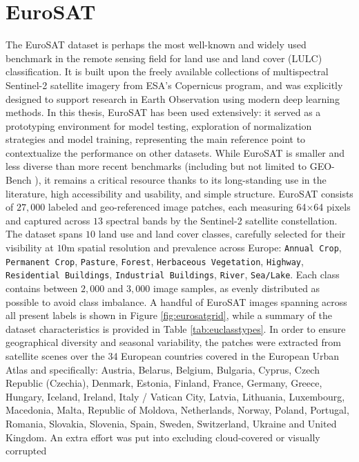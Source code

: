 \documentclass[a4paper, twoside, english]{sapthesis} %
\begin{document}

\section{EuroSAT}\label{EuroSAT}

The EuroSAT dataset \cite{helber2019eurosat} is perhaps the most well-known and widely used benchmark in the remote sensing field for land use and land cover (LULC) classification. It is built upon the freely available collections of multispectral Sentinel-2 satellite imagery from ESA’s Copernicus program, and was explicitly designed to support research in Earth Observation using modern deep learning methods. In this thesis, EuroSAT has been used extensively: it served as a prototyping environment for model testing, exploration of normalization strategies and model training, representing the main reference point to contextualize the performance on other datasets. While EuroSAT is smaller and less diverse than more recent benchmarks (including but not limited to GEO-Bench \cite{lacoste2023geo}), it remains a critical resource thanks to its long-standing use in the literature, high accessibility and usability, and simple structure. EuroSAT consists of $27,000$ labeled and geo-referenced image patches, each measuring 64×64 pixels and captured across $13$ spectral bands by the Sentinel-2 satellite constellation. The dataset spans $10$ land use and land cover classes, carefully selected for their visibility at $10$m spatial resolution and prevalence across Europe: \texttt{Annual Crop}, \texttt{Permanent Crop}, \texttt{Pasture}, \texttt{Forest}, \texttt{Herbaceous Vegetation}, \texttt{Highway}, \texttt{Residential Buildings}, \texttt{Industrial Buildings}, \texttt{River}, \texttt{Sea/Lake}. Each class contains between $2,000$ and $3,000$ image samples, as evenly distributed as possible to avoid class imbalance. A handful of EuroSAT images spanning across all present labels is shown in Figure \ref{fig:eurosatgrid}, while a summary of the dataset characteristics is provided in Table \ref{tab:euclasstypes}. In order to ensure geographical diversity and seasonal variability, the patches were extracted from satellite scenes over the 34 European countries covered in the European Urban Atlas and specifically: Austria, Belarus, Belgium, Bulgaria, Cyprus, Czech Republic (Czechia), Denmark, Estonia, Finland, France, Germany, Greece, Hungary, Iceland, Ireland, Italy / Vatican City, Latvia, Lithuania, Luxembourg, Macedonia, Malta, Republic of Moldova, Netherlands, Norway, Poland, Portugal, Romania, Slovakia, Slovenia, Spain, Sweden, Switzerland, Ukraine and United Kingdom. An extra effort was put into excluding cloud-covered or visually corrupted 
\end{document}

